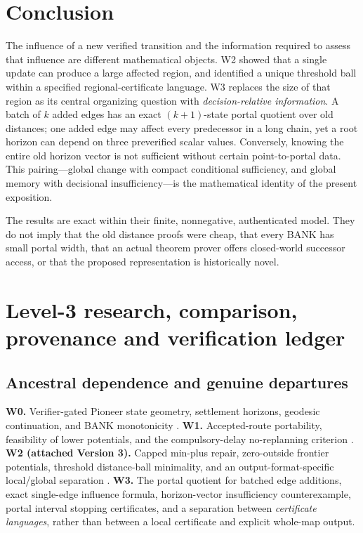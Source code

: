 \documentclass[11pt,letterpaper]{article}
\begin{document}
\section{Conclusion}
The influence of a new verified transition and the information required to assess that influence are different mathematical objects. W2 showed that a single update can produce a large affected region, and identified a unique threshold ball within a specified regional-certificate language. W3 replaces the size of that region as its central organizing question with \emph{decision-relative information}. A batch of $k$ added edges has an exact $(k+1)$-state portal quotient over old distances; one added edge may affect every predecessor in a long chain, yet a root horizon can depend on three preverified scalar values. Conversely, knowing the entire old horizon vector is not sufficient without certain point-to-portal data. This pairing---global change with compact conditional sufficiency, and global memory with decisional insufficiency---is the mathematical identity of the present exposition.

The results are exact within their finite, nonnegative, authenticated model. They do not imply that the old distance proofs were cheap, that every BANK has small portal width, that an actual theorem prover offers closed-world successor access, or that the proposed representation is historically novel.

\appendix
\section{Level-3 research, comparison, provenance and verification ledger}
\subsection*{Ancestral dependence and genuine departures}
\textbf{W0.} Verifier-gated Pioneer state geometry, settlement horizons, geodesic continuation, and BANK monotonicity \cite{W0}. \textbf{W1.} Accepted-route portability, feasibility of lower potentials, and the compulsory-delay no-replanning criterion \cite{W1}. \textbf{W2 (attached Version 3).} Capped min-plus repair, zero-outside frontier potentials, threshold distance-ball minimality, and an output-format-specific local/global separation \cite{W2}. \textbf{W3.} The portal quotient for batched edge additions, exact single-edge influence formula, horizon-vector insufficiency counterexample, portal interval stopping certificates, and a separation between \emph{certificate languages}, rather than between a local certificate and explicit whole-map output.
\end{document}
